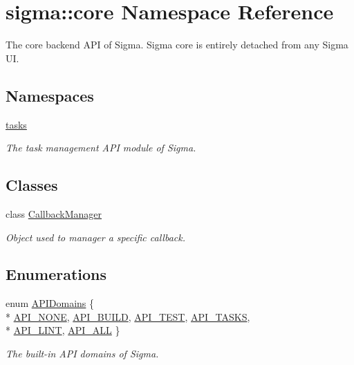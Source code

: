 \hypertarget{namespacesigma_1_1core}{\section{sigma\-:\-:core Namespace Reference}
\label{namespacesigma_1_1core}
}


The core backend A\-P\-I of Sigma. Sigma core is entirely detached from any Sigma U\-I.  


\subsection*{Namespaces}
\begin{DoxyCompactItemize}
\item 
\hyperlink{namespacesigma_1_1core_1_1tasks}{tasks}
\begin{DoxyCompactList}\small\item\em The task management A\-P\-I module of Sigma. \end{DoxyCompactList}\end{DoxyCompactItemize}
\subsection*{Classes}
\begin{DoxyCompactItemize}
\item 
class \hyperlink{classsigma_1_1core_1_1_callback_manager}{Callback\-Manager}
\begin{DoxyCompactList}\small\item\em Object used to manager a specific callback. \end{DoxyCompactList}\end{DoxyCompactItemize}
\subsection*{Enumerations}
\begin{DoxyCompactItemize}
\item 
enum \hyperlink{namespacesigma_1_1core_a48ec553a4adec5e4ca04a94946e39227}{A\-P\-I\-Domains} \{ \\*
\hyperlink{namespacesigma_1_1core_a48ec553a4adec5e4ca04a94946e39227ad5c128a2a2f3f1354dc44fd6e477b2c9}{A\-P\-I\-\_\-\-N\-O\-N\-E}, 
\hyperlink{namespacesigma_1_1core_a48ec553a4adec5e4ca04a94946e39227a21b294c75f929374e9eebfa67e31d80b}{A\-P\-I\-\_\-\-B\-U\-I\-L\-D}, 
\hyperlink{namespacesigma_1_1core_a48ec553a4adec5e4ca04a94946e39227acd512ee6c623f9c4b6faafc279cb93c8}{A\-P\-I\-\_\-\-T\-E\-S\-T}, 
\hyperlink{namespacesigma_1_1core_a48ec553a4adec5e4ca04a94946e39227a165d0d460d4f55091c38bab695b27bb4}{A\-P\-I\-\_\-\-T\-A\-S\-K\-S}, 
\\*
\hyperlink{namespacesigma_1_1core_a48ec553a4adec5e4ca04a94946e39227aac7402732b780aa9407183ed7bd7c809}{A\-P\-I\-\_\-\-L\-I\-N\-T}, 
\hyperlink{namespacesigma_1_1core_a48ec553a4adec5e4ca04a94946e39227a5328f8d7cbf6b6709e5f314832bcb007}{A\-P\-I\-\_\-\-A\-L\-L}
 \}
\begin{DoxyCompactList}\small\item\em The built-\/in A\-P\-I domains of Sigma. \end{DoxyCompactList}\end{DoxyCompactItemize}
